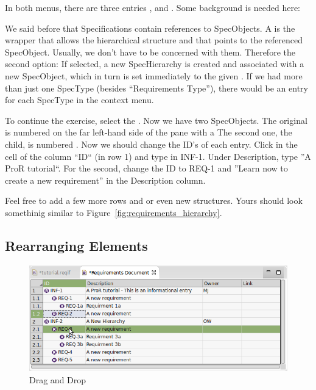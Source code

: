 In both menus, there are three entries ,  and .  Some background is needed here:

We said before that Specifications contain references to SpecObjects.  A  is the wrapper that allows the hierarchical structure and that points to the referenced SpecObject.  Usually, we don't have to be concerned with them.  Therefore the second option: If selected, a new SpecHierarchy is created and associated with a new SpecObject, which in turn is set immediately to the given .  If we had more than just one SpecType (besides ``Requirements Type''), there would be an entry for each SpecType in the context menu.

To continue the exercise, select the .  Now we have two SpecObjects.  The original is numbered on the far left-hand side of the pane with a   The second one, the child, is numbered .  Now we should change the ID's of each entry.  Click in the cell of the column ``ID`` (in row 1) and type in INF-1.  Under Description, type ''A ProR tutorial``.  For the second, change the ID to REQ-1 and ''Learn now to create a new requirement'' in the Description column.

Feel free to add a few more rows and or even new structures.  Yours should look somethinig similar to Figure~\ref{fig:requirements_hierarchy}.

\subsection{Rearranging Elements}

\begin{figure}
\centering
\includegraphics[width=0.8\linewidth]{../rmf-images/draganddrop.png}    
\caption{Drag and Drop}      
\label{fig:dragAndDropChild}
\end{figure}

